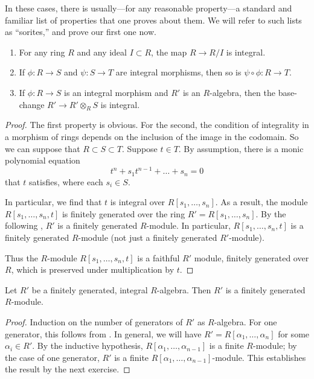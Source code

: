 In these cases, there is usually---for any reasonable property---a standard
and familiar list of
properties that one proves about them. We will refer to such lists as
``sorites,'' and prove our first one now.

\begin{proposition}
\begin{enumerate}
\item For any ring $R$ and any ideal $I \subset R$, the map $R \to R/I$ is
integral.
\item If $\phi: R \to S$ and $\psi: S \to T$ are integral morphisms, then so
is $\psi \circ \phi: R \to T$.
\item If $\phi: R \to S$ is an integral morphism and $R'$ is an $R$-algebra,
then the base-change
$R' \to R' \otimes_R S$ is integral.
\end{enumerate}
\end{proposition}

\begin{proof}
The first property is obvious. For the second, the condition of
integrality in a morphism of rings depends on the inclusion of the image
in the codomain. So we can suppose that $R \subset S \subset T$. Suppose $t
\in T$. By assumption, there is a monic polynomial equation
\[ t^n + s_1 t^{n-1} + \dots + s_n = 0  \]
that $t$ satisfies, where each $s_i \in S$.

In particular, we find that $t$ is integral over $R[s_1, \dots, s_n]$.
As a result, the module $R[s_1, \dots, s_n, t]$ is finitely generated over the
ring $R'=R[s_1, \dots, s_n]$.
By the following , $R'$ is a finitely generated
$R$-module. In
particular, $R[s_1, \dots, s_n,t]$ is a finitely generated $R$-module (not
just a
finitely generated $R'$-module).

Thus the $R$-module $R[s_1, \dots, s_n,t]$  is a faithful
$R'$ module, finitely generated over $R$, which is preserved under
multiplication by $t$.
\end{proof}

\begin{lemma}
Let $R'$ be a finitely generated, integral $R$-algebra. Then $R'$ is a
finitely generated $R$-module.
\end{lemma}
\begin{proof}
Induction on the number of generators of $R'$ as $R$-algebra. For one
generator, this follows from .
In general, we will have $R' = R[\alpha_1 ,\dots, \alpha_n]$ for some
$\alpha_i \in R'$.
By the inductive hypothesis, $R[\alpha_1 , \dots, \alpha_{n-1}]$ is a finite
$R$-module; by the case of one generator, $R'$ is a finite $R[\alpha_1, \dots,
\alpha_{n-1}]$-module. This establishes the result by the next exercise.
\end{proof}


